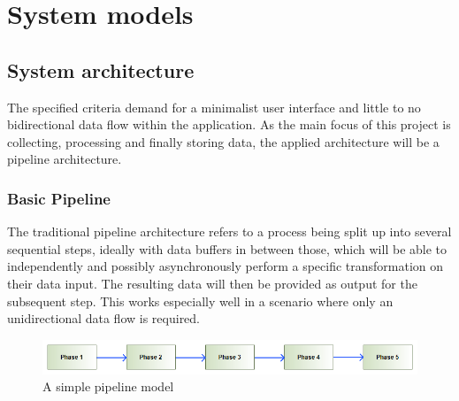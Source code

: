 \chapter{System models}
\label{ch:sysmodels}

\section{System architecture}
\label{sec:sysarchitecture}
The specified criteria demand for a minimalist user interface and little to no bidirectional data flow within the application. As the main focus of this project is collecting, processing and finally storing data, the applied architecture will be a pipeline architecture.

\subsection{Basic Pipeline}
\label{sec:sm_basicpipe}
The traditional pipeline architecture refers to a process being split up into several sequential steps, ideally with data buffers in between those, which will be able to independently and possibly asynchronously perform a specific transformation on their data input. The resulting data will then be provided as output for the subsequent step. This works especially well in a scenario where only an unidirectional data flow is required.
\begin{figure}[h!]
  \includegraphics[width=1.00\textwidth]{resources/simplepipeline.png}
  \centering
  \caption{A simple pipeline model}
  \label{fig:sm_basicpipe}
\end{figure}

